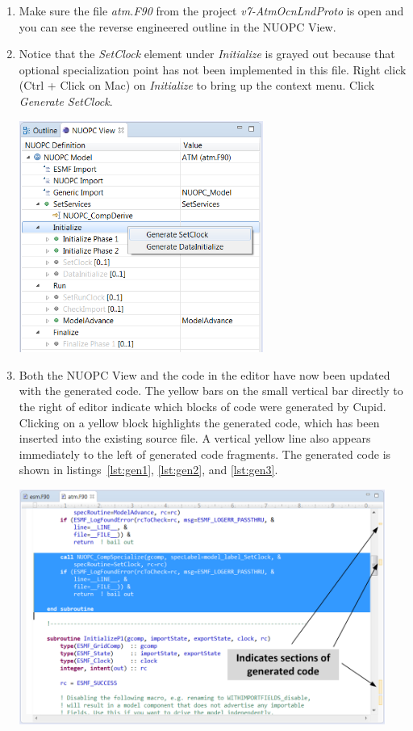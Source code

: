 \documentclass[oneside,11pt]{memoir}
\begin{document}
\begin{enumerate}

\item Make sure the file \emph{atm.F90} from the project \emph{v7-AtmOcnLndProto} is open and you can see the reverse engineered outline in the NUOPC View.

\item Notice that the \emph{SetClock} element under \emph{Initialize} is grayed out because that optional specialization point has not been implemented in this file. Right click (Ctrl + Click on Mac) on \emph{Initialize} to bring up the context menu. Click \emph{Generate SetClock}.

\vspace{24pt}
\parbox{\linewidth}{\centering
  \includegraphics[width=8cm]{figs/gen_fig1.png}
}
\vspace{24pt}

\item Both the NUOPC View and the code in the editor have now been updated with the generated code. The yellow bars on the small vertical bar directly to the right of editor indicate which blocks of code were generated by Cupid.  Clicking on a yellow block highlights the generated code, which has been inserted into the existing source file.  A vertical yellow line also appears immediately to the left of generated code fragments. The generated code is shown in listings~\ref{lst:gen1}, \ref{lst:gen2}, and \ref{lst:gen3}.

\vspace{24pt}
\parbox{\linewidth}{\centering
  \includegraphics[width=12cm]{figs/gen_fig2.png}
}


\end{enumerate}
\end{document}
